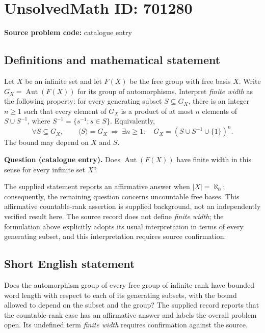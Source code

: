 \documentclass[11pt]{article}
\begin{document}
\section*{UnsolvedMath ID: 701280}
\textbf{Source problem code:} catalogue entry
\subsection{Definitions and mathematical statement}
Let \(X\) be an infinite set and let \(F(X)\) be the free group with free basis \(X\). Write \(G_X=\operatorname{Aut}(F(X))\) for its group of automorphisms. Interpret \emph{finite width} as the following property: for every generating subset \(S\subseteq G_X\), there is an integer \(n\geq 1\) such that every element of \(G_X\) is a product of at most \(n\) elements of \(S\cup S^{-1}\), where \(S^{-1}=\{s^{-1}:s\in S\}\). Equivalently,
\[
\forall S\subseteq G_X,\qquad
\langle S\rangle=G_X\ \Longrightarrow\ \exists n\geq 1:\quad
G_X=(S\cup S^{-1}\cup\{1\})^n.
\]
The bound may depend on \(X\) and \(S\).

\textbf{Question (catalogue entry).} Does \(\operatorname{Aut}(F(X))\) have finite width in this sense for every infinite set \(X\)?

The supplied statement reports an affirmative answer when \(|X|=\aleph_0\); consequently, the remaining question concerns uncountable free bases. This affirmative countable-rank assertion is supplied background, not an independently verified result here. The source record does not define \emph{finite width}; the formulation above explicitly adopts its usual interpretation in terms of every generating subset, and this interpretation requires source confirmation.
\subsection{Short English statement}
Does the automorphism group of every free group of infinite rank have bounded word length with respect to each of its generating subsets, with the bound allowed to depend on the subset and the group? The supplied record reports that the countable-rank case has an affirmative answer and labels the overall problem open. Its undefined term \emph{finite width} requires confirmation against the source.
\end{document}
